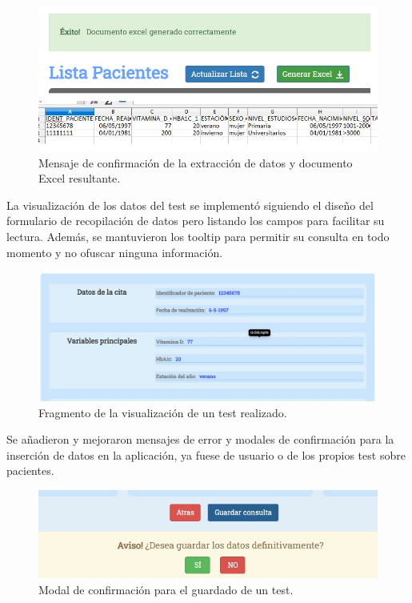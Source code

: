 \begin{figure}[h]
    \centering
     \includegraphics[width=1\textwidth]{images/extraerDatos.jpg}
    \caption{Mensaje de confirmación de la extracción de datos y documento Excel resultante.}
\end{figure}
\newpage

La visualización de los datos del test se implementó siguiendo el diseño del formulario de recopilación de datos pero listando los campos para facilitar su lectura. Además, se mantuvieron los tooltip para permitir su consulta en todo momento y no ofuscar ninguna información.

\begin{figure}[h]
    \centering
     \includegraphics[width=1\textwidth]{images/visualizarTest.jpg}
    \caption{Fragmento de la visualización de un test realizado.}
\end{figure}

Se añadieron y mejoraron mensajes de error y modales de confirmación para la inserción de datos en la aplicación, ya fuese de usuario o de los propios test sobre pacientes.

\begin{figure}[h]
    \centering
     \includegraphics[width=1\textwidth]{images/modales.jpg}
    \caption{Modal de confirmación para el guardado de un test.}
\end{figure}

